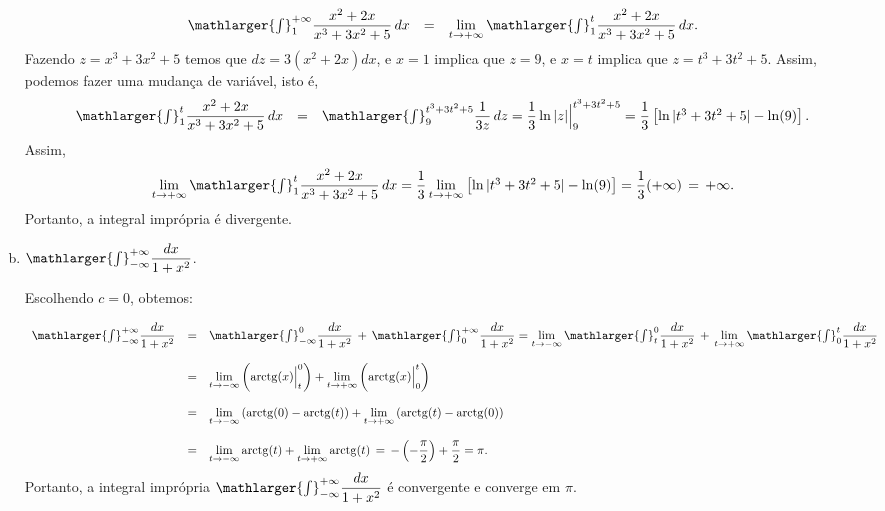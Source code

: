 \cleardoublepage\documentclass[../main.tex]{subfiles}
\begin{document}
\begin{ex}
\begin{enumerate}[a)]
\begin{solution}
\[ \begin{array}{rcl} \mathlarger{\int}^{+\infty}_{1} \dfrac{x^2+2x}{x^3+3x^2+5}\,dx &=& \lim\limits_{t\to +\infty}\mathlarger{\int}^{t}_{1} \dfrac{x^2+2x}{x^3+3x^2+5}\,dx. \end{array} \] Fazendo $z=x^3+3x^2+5$ temos que $dz=3(x^2+2x)dx$, e $x=1$ implica que $z=9$, e $x=t$ implica que $z=t^3+3t^2+5$. Assim, podemos fazer uma mudança de variável, isto é, \[ \begin{array}{rcl} \mathlarger{\int}^{t}_{1} \dfrac{x^2+2x}{x^3+3x^2+5}\,dx &=& \mathlarger{\int}^{t^3+3t^2+5}_{9}\dfrac{1}{3z}\,dz=\dfrac{1}{3} \ln|z|\Big{|}^{t^3+3t^2+5}_{9}=\dfrac{1}{3}\left[\ln|t^3+3t^2+5|- \ln(9)\right]. \end{array} \] Assim, \[ \begin{array}{rcl} \lim\limits_{t\to +\infty}\mathlarger{\int}^{t}_{1} \dfrac{x^2+2x}{x^3+3x^2+5}\,dx=\dfrac{1}{3} \lim\limits_{t\to +\infty}\left[\ln|t^3+3t^2+5|- \ln(9)\right]=\dfrac{1}{3}(+\infty)\,=\,+\infty. \end{array} \]
Portanto, a integral imprópria é divergente.
\end{solution}
\item \(\mathlarger{\int}^{+\infty}_{-\infty} \dfrac{dx}{1+x^2}\).

\begin{solution}
Escolhendo \(c=0\), obtemos:

\[ \begin{array}{rcl} \mathlarger{\int}^{+\infty}_{-\infty} \dfrac{dx}{1+x^2} &=&\mathlarger{\int}^{0}_{-\infty} \dfrac{dx}{1+x^2}\,+\,\mathlarger{\int}^{+\infty}_{0} \dfrac{dx}{1+x^2} = \lim\limits_{t\to -\infty} \mathlarger{\int}^{0}_{t} \dfrac{dx}{1+x^2}\,+\,\lim\limits_{t\to +\infty} \mathlarger{\int}^{t}_{0} \dfrac{dx}{1+x^2}\\ \\ &=& \lim\limits_{t\to -\infty} \left( {\rm arctg}(x) \Big{|}^{0}_{t}\right) + \lim\limits_{t\to +\infty} \left( {\rm arctg}(x) \Big{|}^{t}_{0}\right)\\ \\ &=& \lim\limits_{t\to -\infty} \left( {\rm arctg}(0)- {\rm arctg}(t)\right) + \lim\limits_{t\to +\infty} \left( {\rm arctg}(t)- {\rm arctg}(0)\right)\\ \\ &=& \lim\limits_{t\to -\infty} {\rm arctg}(t) + \lim\limits_{t\to +\infty} {\rm arctg}(t)\, =\, -\left(-\dfrac{\pi}{2}\right) + \dfrac{\pi}{2}=\pi. \end{array} \]
Portanto, a integral imprópria \(\mathlarger{\int}^{+\infty}_{-\infty} \dfrac{dx}{1+x^2}\) é convergente e converge em \(\pi\).
\end{solution}
\end{enumerate}
\end{ex}
\end{document}
